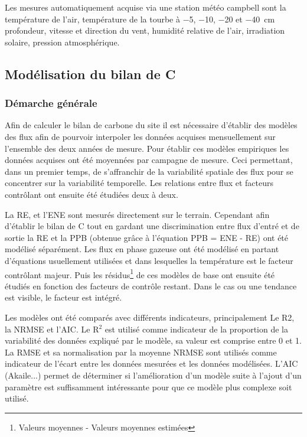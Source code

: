 Les mesures automatiquement acquise via une station météo campbell sont la température de l'air, température de la tourbe à \num{-5}, \num{-10}, \num{-20} et \SI{-40}{\centi\metre} profondeur, vitesse et direction du vent, humidité relative de l'air, irradiation solaire, pression atmosphérique.

\subsection{Modélisation du bilan de C}

\subsubsection{Démarche générale}

Afin de calculer le bilan de carbone du site il est nécessaire d'établir des modèles des flux afin de pourvoir interpoler les données acquises mensuellement sur l'ensemble des deux années de mesure.
Pour établir ces modèles empiriques les données acquises ont été moyennées par campagne de mesure.
Ceci permettant, dans un premier temps, de s'affranchir de la variabilité spatiale des flux pour se concentrer sur la variabilité temporelle.
Les relations entre flux et facteurs contrôlant ont ensuite été étudiées deux à deux.

La RE, et l'ENE sont mesurés directement sur le terrain.
Cependant afin d'établir le bilan de C tout en gardant une discrimination entre flux d'entré et de sortie la RE et la PPB (obtenue grâce à l'équation PPB = ENE - RE) ont été modélisé séparément.
Les flux en phase gazeuse ont été modélisé en partant d'équations usuellement utilisées et dans lesquelles la température est le facteur contrôlant majeur.
Puis les résidus\footnote{Valeurs moyennes - Valeurs moyennes estimées} de ces modèles de base ont ensuite été étudiés en fonction des facteurs de contrôle restant.
Dans le cas ou une tendance est visible, le facteur est intégré.

Les modèles ont été comparés avec différents indicateurs, principalement Le R2, la NRMSE et l'AIC.
Le R$^{2}$ est utilisé comme indicateur de la proportion de la variabilité des données expliqué par le modèle, sa valeur est comprise entre 0 et 1.
La RMSE et sa normalisation par la moyenne NRMSE sont utilisés comme indicateur de l'écart entre les données mesurées et les données modélisées.
L'AIC (Akaile...) permet de déterminer si l'amélioration d'un modèle suite à l'ajout d'un paramètre est suffisamment intéressante pour que ce modèle plus complexe soit utilisé.

